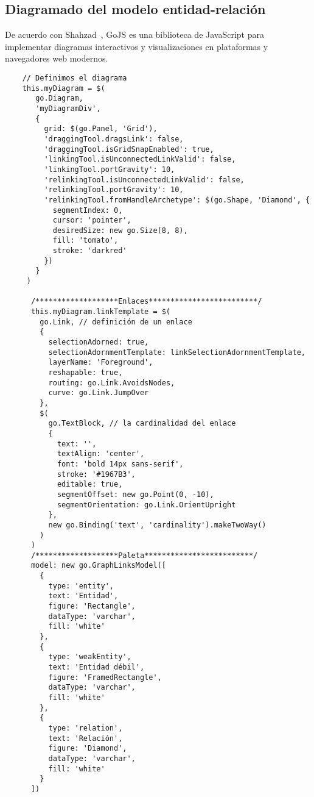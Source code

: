\subsection{Diagramado del modelo entidad-relación}
De acuerdo con Shahzad~\cite{shahzad_review_2016}, GoJS es una biblioteca de JavaScript para implementar diagramas interactivos y visualizaciones en plataformas y navegadores web modernos. 



\begin{code}
\label{code:diagram-gojs}
\begin{verbatim}
    // Definimos el diagrama
    this.myDiagram = $(
       go.Diagram,
       'myDiagramDiv', 
       {
         grid: $(go.Panel, 'Grid'),
         'draggingTool.dragsLink': false,
         'draggingTool.isGridSnapEnabled': true,
         'linkingTool.isUnconnectedLinkValid': false,
         'linkingTool.portGravity': 10,
         'relinkingTool.isUnconnectedLinkValid': false,
         'relinkingTool.portGravity': 10,
         'relinkingTool.fromHandleArchetype': $(go.Shape, 'Diamond', {
           segmentIndex: 0,
           cursor: 'pointer',
           desiredSize: new go.Size(8, 8),
           fill: 'tomato',
           stroke: 'darkred'
         })
       }
     )

      /*******************Enlaces*************************/
      this.myDiagram.linkTemplate = $(
        go.Link, // definición de un enlace
        {
          selectionAdorned: true,
          selectionAdornmentTemplate: linkSelectionAdornmentTemplate,
          layerName: 'Foreground',
          reshapable: true,
          routing: go.Link.AvoidsNodes,
          curve: go.Link.JumpOver
        },
        $(
          go.TextBlock, // la cardinalidad del enlace
          {
            text: '',
            textAlign: 'center',
            font: 'bold 14px sans-serif',
            stroke: '#1967B3',
            editable: true,
            segmentOffset: new go.Point(0, -10),
            segmentOrientation: go.Link.OrientUpright
          },
          new go.Binding('text', 'cardinality').makeTwoWay()
        )
      )
      /*******************Paleta*************************/
      model: new go.GraphLinksModel([
        {
          type: 'entity',
          text: 'Entidad',
          figure: 'Rectangle',
          dataType: 'varchar',
          fill: 'white'
        },
        {
          type: 'weakEntity',
          text: 'Entidad débil',
          figure: 'FramedRectangle',
          dataType: 'varchar',
          fill: 'white'
        },
        {
          type: 'relation',
          text: 'Relación',
          figure: 'Diamond',
          dataType: 'varchar',
          fill: 'white'
        }
      ])
 \end{verbatim}
\end{code}


